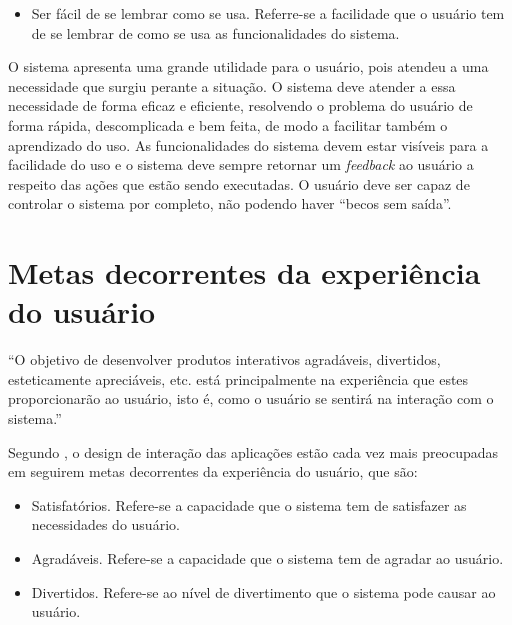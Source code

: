     \begin{itemize}
       \item Ser fácil de se lembrar como se usa.
       \subitem Referre-se a facilidade que o usuário tem de se lembrar de como se usa as funcionalidades do sistema.
    \end{itemize}
  
    O sistema apresenta uma grande utilidade para o usuário, pois atendeu a uma necessidade que surgiu perante a situação. 
    O sistema deve atender a essa necessidade de forma eficaz e eficiente, resolvendo o problema do usuário de forma rápida,
    descomplicada e bem feita, de modo a facilitar também o aprendizado do uso. As funcionalidades do sistema devem estar visíveis 
    para a facilidade do uso e o sistema deve sempre retornar um \textit{feedback} ao usuário a respeito das ações que estão sendo executadas.
    O usuário deve ser capaz de controlar o sistema por completo, não podendo haver “becos sem saída”.

  \section{Metas decorrentes da experiência do usuário}
    
    “O objetivo de desenvolver produtos interativos agradáveis, divertidos, esteticamente apreciáveis, etc. 
    está principalmente na experiência que estes proporcionarão ao usuário, isto é, como o usuário se 
    sentirá na interação com o sistema.” \cite{preece}
    
    Segundo \cite{preece}, o design de interação das aplicações estão cada vez mais preocupadas em seguirem 
    metas decorrentes da experiência do usuário, que são:
    
    \begin{itemize}
       \item Satisfatórios.
       \subitem Refere-se a capacidade que o sistema tem de satisfazer as necessidades do usuário.
    \end{itemize}
    
    \begin{itemize}
       \item Agradáveis.
       \subitem Refere-se a capacidade que o sistema tem de agradar ao usuário.
    \end{itemize}
    
    \begin{itemize}
       \item Divertidos.
       \subitem Refere-se ao nível de divertimento que o sistema pode causar ao usuário.
    \end{itemize}
    
